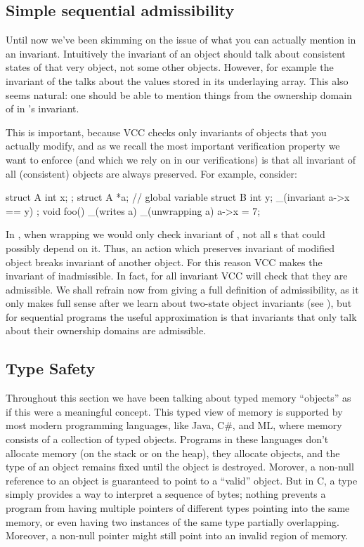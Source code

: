 \subsection{Simple sequential admissibility}
\label{sect:admissibility0}

Until now we've been skimming on the issue of what you can actually
mention in an invariant. 
Intuitively the invariant of an object should talk about consistent states
of that very object, not some other objects.
However, for example the invariant of the  
talks about the values stored in its underlaying array.
This also seems natural: one should be able to mention things
from the ownership domain of  in 's invariant.

This is important, because VCC checks only invariants of objects
that you actually modify, and as we recall the most important
verification property we want to enforce (and which we rely on in our
verifications) is that all invariant of all (consistent) objects 
are always preserved.
For example, consider:

\begin{VCC}
struct A { 
  int x;
};
struct A *a; // global variable
struct B {
  int y;
  _(invariant a->x == y)
};
void foo()
  _(writes a)
{
  _(unwrapping a) {
    a->x = 7;
  }
}
\end{VCC}

\noindent
In , when wrapping  we would only check invariant
of , not all s that could possibly depend on it.
Thus, an action which preserves invariant of modified object breaks invariant of another object.
For this reason VCC makes the invariant of  inadmissible.
In fact, for all invariant VCC will check that they are admissible.
We shall refrain now from giving a full definition of admissibility, as 
it only makes full sense after we learn about two-state object invariants
(see ), but for sequential programs the useful approximation
is that invariants that only talk about their ownership domains are admissible.


\subsection{Type Safety}
\label{sect:type-safety}

Throughout this section
we have been talking about typed memory ``objects'' as if this were a
meaningful concept.  This typed view of memory is supported by most
modern programming languages, like Java, C\#, and ML, where memory
consists of a collection of typed objects. Programs in these languages
don't allocate memory (on the stack or on the heap), they allocate
objects, and the type of an object remains fixed until the object is
destroyed. Morover, a non-null reference to an object is guaranteed to
point to a ``valid'' object. But in C, a type simply provides a way to
interpret a sequence of bytes; nothing prevents a program from having
multiple pointers of different types pointing into the same memory, or
even having two instances of the same  type partially
overlapping. Moreover, a non-null pointer might still point into an
invalid region of memory.

